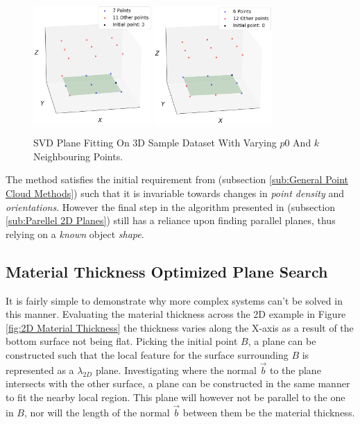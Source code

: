 \documentclass[%
]{USN-MSc}
\begin{document}
\begin{figure}[H]
  \centering
  \includegraphics[width=0.40\textwidth]{fig/6 nearest points optimal.png}
  \includegraphics[width=0.40\textwidth]{fig/6 nearest points edge optimal.png}
  \caption{SVD Plane Fitting On 3D Sample Dataset With Varying \(p0\) And \(k\) Neighbouring Points.}
  \label{fig:Sample Dataset with Optimal Neighberhood Selection}
\end{figure}

The method satisfies the initial requirement from (subsection \ref{sub:General Point Cloud Methods}) such that it is invariable towards changes in \textit{point density} and \textit{orientations}. However the final step in the algorithm presented in (subsection \ref{sub:Parellel 2D Planes}) still has a reliance upon finding parallel planes, thus relying on a \textit{known} object \textit{shape}. 

\subsection{Material Thickness Optimized Plane Search}
\label{subsec:Material Thickness Search and Evaluation}
It is fairly simple to demonstrate why more complex systems can't be solved in this manner. Evaluating the material thickness across the 2D example in Figure \ref{fig:2D Material Thickness} the thickness varies along the X-axis as a result of the bottom surface not being flat. Picking the initial point \(B\), a plane can be constructed such that the local feature for the surface surrounding \(B\) is represented as a \(\lambda_{2D}\) plane. Investigating where the normal \(\vec{b}\) to the plane intersects with the other surface, a plane can be constructed in the same manner to fit the nearby local region. This plane will however not be parallel to the one in \(B\), nor will the length of the normal \(\vec{b}\) between them be the material thickness.
\end{document}
